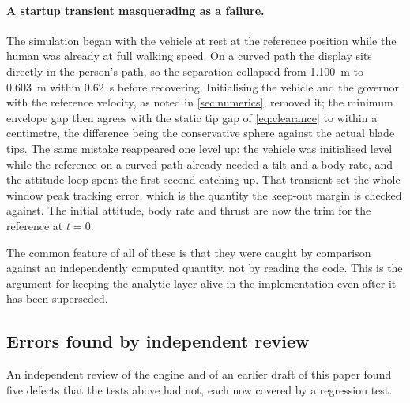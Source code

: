 \paragraph{A startup transient masquerading as a failure.} The simulation began
with the vehicle at rest at the reference position while the human was already
at full walking speed. On a curved path the display sits directly in the
person's path, so the separation collapsed from \SI{1.100}{\metre} to
\SI{0.603}{\metre} within \SI{0.62}{\second} before recovering. Initialising the
vehicle and the governor with the reference velocity, as noted in
\cref{sec:numerics}, removed it; the minimum envelope gap then agrees with the
static tip gap of \cref{eq:clearance} to within a centimetre, the difference
being the conservative sphere against the actual blade tips. The same mistake
reappeared one level up: the vehicle was initialised level while the
reference on a curved path already needed a tilt and a body rate, and the
attitude loop spent the first second catching up. That transient set the
whole-window peak tracking error, which is the quantity the keep-out margin is
checked against. The initial attitude, body rate and thrust are now the trim
for the reference at $t=0$.

\begin{remark}
The common feature of all of these is that they were caught by comparison
against an independently computed quantity, not by reading the code. This is
the argument for keeping the analytic layer alive in the implementation even
after it has been superseded.
\end{remark}

\subsection{Errors found by independent review}

An independent review of the engine and of an earlier draft of this paper
found five defects that the tests above had not, each now covered by a
regression test.

